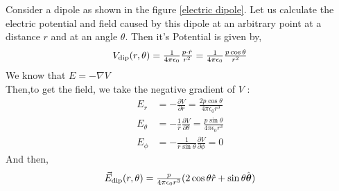 Consider a dipole as shown in the figure \ref{electric dipole}.
Let us calculate the electric potential and field caused by this dipole at an arbitrary point at a distance $r$ and at an angle $\theta$. Then it's Potential is given by,
\begin{equation}
$$
V_{\operatorname{dip}}({r,\theta})=\frac{1}{4 \pi \epsilon_{0}} \frac{{p} \cdot \hat{{r}}}{r^{2}}
=\frac{1}{4 \pi \epsilon_{0}} \frac{{p} \cos\theta}{r^{2}}
$$
\end{equation}
We know that $E=-\nabla V$
\\Then,to get the field, we take the negative gradient of $V$ :
\begin{align*}
E_{r}&=-\frac{\partial V}{\partial r}=\frac{2 p \cos \theta}{4 \pi \epsilon_{0} r^{3}} \\
E_{\theta}&=-\frac{1}{r} \frac{\partial V}{\partial \theta}=\frac{p \sin \theta}{4 \pi \epsilon_{0} r^{3}} \\
E_{\phi}&=-\frac{1}{r \sin \theta} \frac{\partial V}{\partial \phi}=0
\end{align*}
And then,
\begin{equation}
$$
\vec{E}_{\mathrm{dip}}(r, \theta)=\frac{p}{4 \pi \epsilon_{0} r^{3}}(2 \cos \theta \hat{{r}}+\sin \theta \hat{\boldsymbol{\theta}})
$$
\end{equation}
\begin{center}
\end{center}
